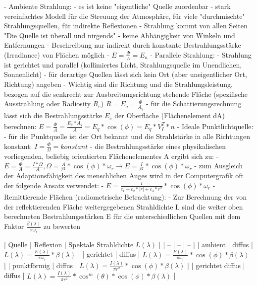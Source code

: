 \documentclass[10pt,landscape]{article}
\begin{document}
\begin{multicols}{3}
  
  - Ambiente Strahlung:
  - es ist keine "eigentliche" Quelle zuordenbar
  - stark vereinfachtes Modell für die Streuung der Atmosphäre, für viele "durchmischte" Strahlungsquellen, für indirekte Reflexionen
  - Strahlung kommt von allen Seiten "Die Quelle ist überall und nirgends"
  - keine Abhängigkeit von Winkeln und Entfernungen
  - Beschreibung nur indirekt durch konstante Bestrahlungsstärke (Irradiance) von Flächen möglich
  - $E=\frac{\Phi}{A}=E_a$
  - Parallele Strahlung:
  - Strahlung ist gerichtet und parallel (kollimiertes Licht, Strahlungsquelle im Unendlichen, Sonnenlicht)
  - für derartige Quellen lässt sich kein Ort (aber uneigentlicher Ort, Richtung) angeben
  - Wichtig sind die Richtung und die Strahlungsleistung, bezogen auf die senkrecht zur Ausbreitungsrichtung stehende Fläche (spezifische Ausstrahlung oder Radiosity $R_e$) $R=E_q=\frac{\Phi}{A_q}$
  - für die Schattierungsrechnung lässt sich die Bestrahlungsstärke $E_e$ der Oberfläche (Flächenelement dA) berechnen: $E=\frac{\Phi}{A}=\frac{E_q*A_q}{A}=E_q*\cos(\phi) = E_q*V_I^T*n$
  - Ideale Punktlichtquelle:
  - für die Punktquelle ist der Ort bekannt und die Strahlstärke in alle Richtungen konstant: $I=\frac{\Phi}{\Omega}=konstant$
  - die Bestrahlungsstärke eines physikalischen vorliegenden, beliebig orientierten Flächenelementes A ergibt sich zu:
  - $E=\frac{\Phi}{A}=\frac{I*\Omega}{A}, \Omega=\frac{A}{r^2}*\cos(\phi)*\omega_r \rightarrow E=\frac{I}{r^2}*\cos(\phi)*\omega_r$
  - zum Ausgleich der Adaptionsfähigkeit des menschlichen Auges wird in der Computergrafik oft der folgende Ansatz verwendet:
  - $E=\frac{I}{c_1+c_2*|r|+c_3*r^2}*\cos(\phi)*\omega_r$
  - Remittierende Flächen (radiometrische Betrachtung):
  - Zur Berechnung der von der reflektierenden Fläche weitergegebenen Strahldichte L sind die weiter oben berechneten Bestrahlungsstärken E für die unterschiedlichen Quellen mit dem Faktor $\frac{\beta(\lambda)}{\pi\omega_r}$ zu bewerten
  
  | Quelle | Reflexion | Spektale Strahldichte $L(\lambda)$ |
  | -- | -- | -- |
  | ambient | diffus | $L(\lambda)=\frac{E(\lambda)}{\pi\omega_r}*\beta(\lambda)$ |
  | gerichtet | diffus | $L(\lambda)=\frac{E(\lambda)}{\pi\omega_r}*\cos(\phi)*\beta(\lambda)$ |
  | punktförmig | diffus | $L(\lambda) = \frac{I(\lambda)}{\pi r^2 }*\cos(\phi)*\beta(\lambda)$ |
  | gerichtet diffus | diffus | $L(\lambda)=\frac{I(\lambda)}{\pi r^2 }* \cos^m(\theta)*\cos(\phi)*\beta(\lambda)$ |
  

\end{multicols}
\end{document}
